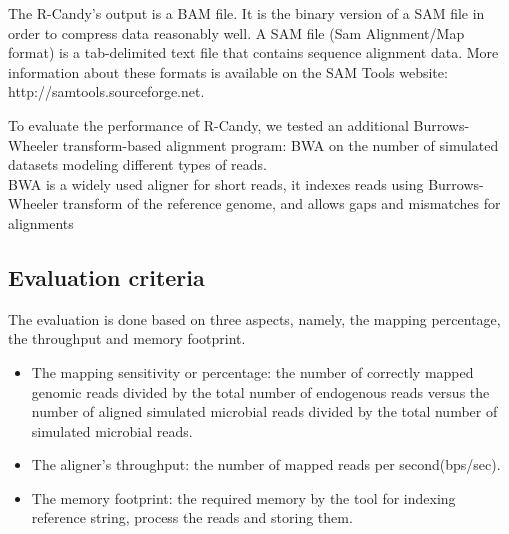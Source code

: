 \documentclass[11pt,a4paper]{report}
\begin{document}
The R-Candy's output is a BAM file. It is the binary version of a SAM file in order to compress data reasonably well.  A SAM file (Sam Alignment/Map format) is a tab-delimited text file that contains sequence alignment data.   
More information about these formats is available on the SAM Tools website: http://samtools.sourceforge.net.






To evaluate the performance of R-Candy, we tested an additional Burrows-Wheeler 
transform-based alignment program: BWA \cite{bwa}
on the number of simulated datasets modeling different types of reads. \\
BWA is a widely used aligner for short reads, it indexes reads using Burrows-
Wheeler transform of the reference genome, and allows gaps and mismatches for alignments\\


\subsection{Evaluation criteria}

The evaluation is done based on three aspects, namely, 
the mapping percentage, the throughput and memory footprint.

\begin{itemize}

 \item The mapping sensitivity or percentage:
the number of correctly mapped genomic reads divided by the total number of endogenous reads versus the number of aligned simulated microbial reads 
divided by the total number of simulated microbial reads.

 \item The aligner's throughput: the number of mapped reads per second(bps/sec).

 \item The memory footprint: the required memory by the tool for indexing reference string, process the reads and storing them. 

\end{itemize}
\end{document}
